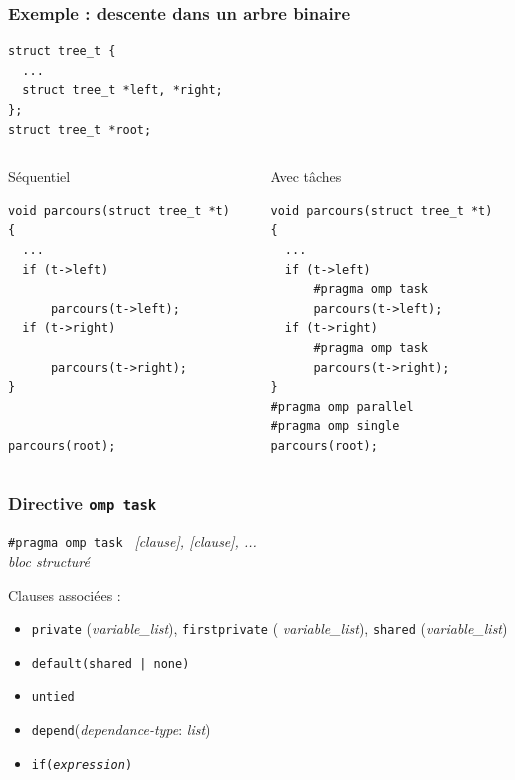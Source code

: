 \documentclass{beamer}
\begin{document}
\begin{frame}[fragile]
  \frametitle{Exemple : descente dans un arbre binaire}

\begin{verbatim}
struct tree_t {
  ...
  struct tree_t *left, *right;
};
struct tree_t *root;
\end{verbatim}

\begin{columns}[T]
  \begin{column}{0.49\textwidth}
    \begin{block}{Séquentiel}
\begin{verbatim}
void parcours(struct tree_t *t)
{
  ...
  if (t->left) 

      parcours(t->left);
  if (t->right) 

      parcours(t->right);
}


parcours(root);
\end{verbatim}
    \end{block}
  \end{column}

  \begin{column}{0.49\textwidth}
    \begin{block}{Avec tâches\phantom{Sq}}
\begin{verbatim}
void parcours(struct tree_t *t)
{
  ...
  if (t->left) 
      #pragma omp task
      parcours(t->left);
  if (t->right) 
      #pragma omp task
      parcours(t->right);
}
#pragma omp parallel
#pragma omp single
parcours(root);
\end{verbatim}
    \end{block}
  \end{column}
\end{columns}
\end{frame}


\begin{frame}
  \frametitle{Directive \texttt{omp task}}

  \begin{framed}
  {\tt \#pragma omp task } {\it [clause], [clause], ...}  \\
  {\it bloc structuré} 
\end{framed}

\medskip

Clauses associées :
  \begin{itemize}
  \item  {\tt private} ({\it variable\_list}), {\tt firstprivate} ({\it
      variable\_list}), {\tt shared} ({\it variable\_list})
  \item {\tt default(shared | none)}
  \item {\tt untied}
  \item {\tt depend}({\it dependance-type}: {\it list})
  \item {\tt if({\it expression})}
  \end{itemize}  
\end{frame}
\end{document}
